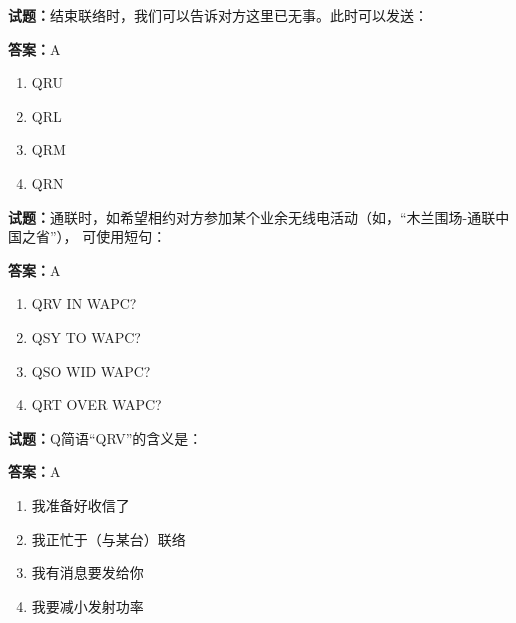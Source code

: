 \documentclass{ctexbook}
\begin{document}





\vspace{1em}

\textbf{试题：}结束联络时，我们可以告诉对方这里已无事。此时可以发送： 

\textbf{答案：}A 

\begin{enumerate}[leftmargin=3em]
  \item QRU 

  \item QRL 

  \item QRM 

  \item QRN 

\end{enumerate}





\vspace{1em}

\textbf{试题：}通联时，如希望相约对方参加某个业余无线电活动（如，“木兰围场-通联中国之省”），
可使用短句： 

\textbf{答案：}A 

\begin{enumerate}[leftmargin=3em]
  \item QRV IN WAPC? 

  \item QSY TO WAPC? 

  \item QSO WID WAPC? 

  \item QRT OVER WAPC? 

\end{enumerate}





\vspace{1em}

\textbf{试题：}Q简语“QRV”的含义是： 

\textbf{答案：}A 

\begin{enumerate}[leftmargin=3em]
  \item 我准备好收信了 

  \item 我正忙于（与某台）联络 

  \item 我有消息要发给你 

  \item 我要减小发射功率 

\end{enumerate}
\end{document}
